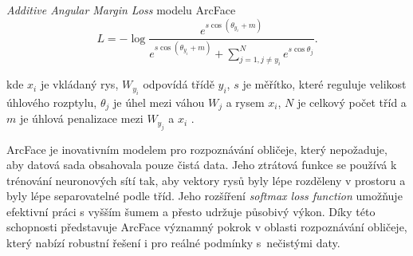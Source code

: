 \noindent \textit{Additive Angular Margin Loss} modelu ArcFace
\begin{equation}
    {L}=-\log\frac{e^{s\cos(\theta_{y_i}+m)}}{e^{s\cos(\theta_{y_i}+m)}+\sum_{j=1,j\neq  y_i}^{N}e^{s\cos\theta_{j}}}.
    \label{eq:arcface}
\end{equation}

kde $x_i$ je vkládaný rys, $W_{y_i}$ odpovídá třídě $y_i$, $s$ je měřítko, které reguluje velikost úhlového rozptylu, $\theta_{j}$ je úhel mezi váhou $W_j$ a rysem $x_i$, $N$ je celkový počet tříd a $m$ je úhlová penalizace mezi $W_{y_j}$ a $x_i$ \cite{Deng_2022}.

\bigskip

ArcFace je inovativním modelem pro rozpoznávání obličeje, který nepožaduje, aby datová sada obsahovala pouze čistá data. Jeho ztrátová funkce se používá k trénování neuronových sítí tak, aby vektory rysů byly lépe rozděleny v prostoru a byly lépe separovatelné podle tříd. Jeho rozšíření \textit{softmax loss function} umožňuje efektivní práci s vyšším šumem a přesto udržuje působivý výkon. Díky této schopnosti představuje ArcFace významný pokrok v oblasti rozpoznávání obličeje, který nabízí robustní řešení i pro reálné podmínky s~nečistými daty.

